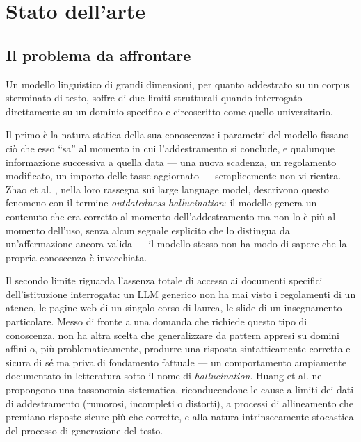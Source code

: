 \chapter{Stato dell'arte}
\label{cap:stato-arte}


\section{Il problema da affrontare}
\label{sec:problema}

Un modello linguistico di grandi dimensioni, per quanto addestrato su un corpus sterminato di testo, soffre di due
limiti strutturali quando interrogato direttamente su un dominio specifico e circoscritto come quello universitario.

Il primo è la natura statica della sua conoscenza: i parametri del modello fissano ciò che esso ``sa'' al momento in
cui l'addestramento si conclude, e qualunque informazione successiva a quella data --- una nuova scadenza, un
regolamento modificato, un importo delle tasse aggiornato --- semplicemente non vi rientra. Zhao et al.
\cite{zhao2023survey}, nella loro rassegna sui large language model, descrivono questo fenomeno con il termine
\emph{outdatedness hallucination}: il modello genera un contenuto che era corretto al momento dell'addestramento ma
non lo è più al momento dell'uso, senza alcun segnale esplicito che lo distingua da un'affermazione ancora valida ---
il modello stesso non ha modo di sapere che la propria conoscenza è invecchiata.

Il secondo limite riguarda l'assenza totale di accesso ai documenti specifici dell'istituzione interrogata: un LLM
generico non ha mai visto i regolamenti di un ateneo, le pagine web di un singolo corso di laurea, le slide di un
insegnamento particolare. Messo di fronte a una domanda che richiede questo tipo di conoscenza, non ha altra scelta
che generalizzare da pattern appresi su domini affini o, più problematicamente, produrre una risposta sintatticamente
corretta e sicura di sé ma priva di fondamento fattuale --- un comportamento ampiamente documentato in letteratura
sotto il nome di \emph{hallucination}. Huang et al. \cite{huang2023survey} ne propongono una tassonomia sistematica,
riconducendone le cause a limiti dei dati di addestramento (rumorosi, incompleti o distorti), a processi di
allineamento che premiano risposte sicure più che corrette, e alla natura intrinsecamente stocastica del processo di
generazione del testo.

